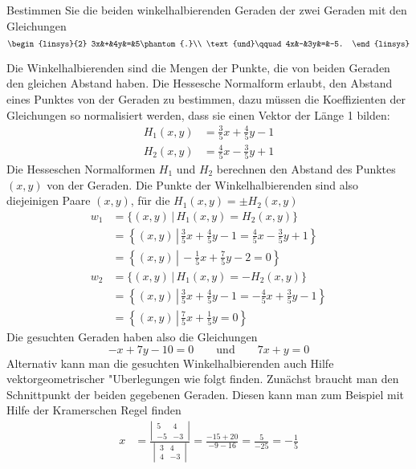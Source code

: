 Bestimmen Sie die beiden winkelhalbierenden Geraden der zwei Geraden
mit den Gleichungen
\[
\begin{linsys}{2}
3x&+&4y&=&5\phantom{.}\\
\text{und}\qquad 4x&-&3y&=&-5.
\end{linsys}
\]

\begin{loesung}
Die Winkelhalbierenden sind die Mengen der Punkte, die von beiden
Geraden den gleichen Abstand haben. Die Hessesche Normalform erlaubt,
den Abstand eines Punktes von der Geraden zu bestimmen, dazu müssen
die Koeffizienten der Gleichungen so normalisiert werden, dass sie
einen Vektor der Länge 1 bilden:
\begin{align*}
H_1(x,y)&=\frac35x+\frac45y-1\\
H_2(x,y)&=\frac45x-\frac35y+1
\end{align*}
Die Hesseschen Normalformen $H_1$ und $H_2$ berechnen den Abstand
des Punktes $(x,y)$ von der Geraden. Die Punkte der Winkelhalbierenden
sind also diejeinigen Paare $(x,y)$, für die $H_1(x,y)=\pm H_2(x,y)$
\begin{align*}
w_1
&=
\{(x,y)\,|\, H_1(x,y)=H_2(x,y)\}
\\
&=
\left\{(x,y)\,\left|\, 
\frac35x+\frac45y-1=\frac45x-\frac35y+1\right.\right\}
\\
&=
\left\{(x,y)\,\left|\,
-\frac15x+\frac75y-2=0
\right.\right\}
\\
w_2&=\{(x,y)\,|\, H_1(x,y)=-H_2(x,y)\}
\\
&=
\left\{(x,y)\,\left|\, 
\frac35x+\frac45y-1=-\frac45x+\frac35y-1\right.\right\}
\\
&=
\left\{(x,y)\,\left|\,
\frac75x+\frac15y=0
\right.\right\}
\end{align*}
Die gesuchten Geraden haben also die Gleichungen
\[
-x+7y-10=0
\qquad
\text{und}
\qquad
7x+y=0
\]
Alternativ kann man die gesuchten Winkelhalbierenden auch Hilfe
vektorgeometrischer "Uberlegungen wie folgt finden.
Zunächst braucht man den Schnittpunkt der beiden gegebenen Geraden.
Diesen kann man zum Beispiel mit Hilfe der Kramerschen Regel
finden
\begin{align*}
x&=\frac{\left|\,\begin{matrix}5&4\\-5&-3\end{matrix}\,\right|}{\left|\,\begin{matrix}3&4\\4&-3\end{matrix}\,\right|}
=\frac{-15+20}{-9-16}=\frac{5}{-25}=-\frac15\\

\end{align*}
\end{loesung}
